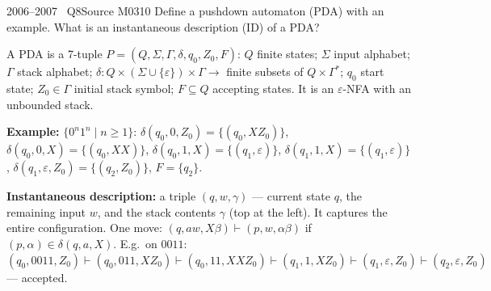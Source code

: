 \documentclass[11pt,a4paper]{article}
\newcommand{\eps}{\varepsilon}
\begin{document}
\begin{question}{2006--2007 \textbullet\ Q8}{Source M03}{10}
Define a pushdown automaton (PDA) with an example. What is an instantaneous description (ID) of a PDA?
\end{question}
\begin{solution}
A PDA is a 7-tuple $P=(Q,\Sigma,\Gamma,\delta,q_0,Z_0,F)$: $Q$ finite states; $\Sigma$ input alphabet; $\Gamma$ stack alphabet; $\delta:Q\times(\Sigma\cup\{\eps\})\times\Gamma\to$ finite subsets of $Q\times\Gamma^*$; $q_0$ start state; $Z_0\in\Gamma$ initial stack symbol; $F\subseteq Q$ accepting states. It is an $\eps$-NFA with an unbounded stack.

\textbf{Example:} $\{0^n1^n\mid n\ge1\}$: $\delta(q_0,0,Z_0)=\{(q_0,XZ_0)\}$, $\delta(q_0,0,X)=\{(q_0,XX)\}$, $\delta(q_0,1,X)=\{(q_1,\eps)\}$, $\delta(q_1,1,X)=\{(q_1,\eps)\}$, $\delta(q_1,\eps,Z_0)=\{(q_2,Z_0)\}$, $F=\{q_2\}$.

\textbf{Instantaneous description:} a triple $(q,w,\gamma)$ --- current state $q$, the remaining input $w$, and the stack contents $\gamma$ (top at the left). It captures the entire configuration. One move: $(q,aw,X\beta)\vdash(p,w,\alpha\beta)$ if $(p,\alpha)\in\delta(q,a,X)$. E.g.\ on $0011$: $(q_0,0011,Z_0)\vdash(q_0,011,XZ_0)\vdash(q_0,11,XXZ_0)\vdash(q_1,1,XZ_0)\vdash(q_1,\eps,Z_0)\vdash(q_2,\eps,Z_0)$ --- accepted.
\end{solution}
\end{document}
